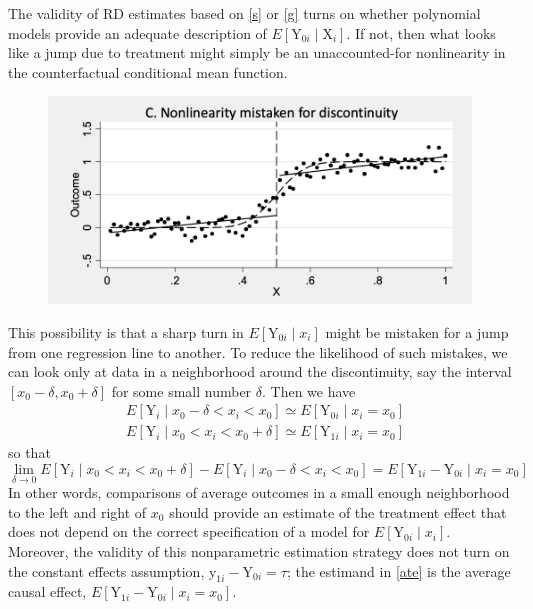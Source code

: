 \documentclass[11pt]{book}%
\begin{document}
The validity of RD estimates based on \ref{s} or \ref{g} turns on whether polynomial models provide an
adequate description of $E\left[\mathrm{Y}_{0 i} \mid \mathrm{X}_{i}\right] .$ If not, then what looks like a jump due to treatment might simply be an
unaccounted-for nonlinearity in the counterfactual conditional mean function.
\begin{figure}[H]
	\centering
	\includegraphics[scale=0.6]{mis.png}
\end{figure}
 This possibility is that a sharp turn in $E\left[\mathrm{Y}_{0 i} \mid x_{i}\right]$ might be mistaken for a jump from
one regression line to another. To reduce the likelihood of such mistakes, we can look only at data in a
neighborhood around the discontinuity, say the interval $\left[x_{0}-\delta, x_{0}+\delta\right]$ for some small number $\delta$. Then we
have
$$
\begin{aligned}
&E\left[\mathrm{Y}_{i} \mid x_{0}-\delta<x_{i}<x_{0}\right] \simeq E\left[\mathrm{Y}_{0 i} \mid x_{i}=x_{0}\right] \\
&E\left[\mathrm{Y}_{i} \mid x_{0}<x_{i}<x_{0}+\delta\right] \simeq E\left[\mathrm{Y}_{1 i} \mid x_{i}=x_{0}\right]
\end{aligned}
$$
so that
\begin{equation}\label{ate}
\lim _{\delta \rightarrow 0} E\left[\mathrm{Y}_{i} \mid x_{0}<x_{i}<x_{0}+\delta\right]-E\left[\mathrm{Y}_{i} \mid x_{0}-\delta<x_{i}<x_{0}\right]=E\left[\mathrm{Y}_{1 i}-\mathrm{Y}_{0 i} \mid x_{i}=x_{0}\right]
\end{equation}
In other words, comparisons of average outcomes in a small enough neighborhood to the left and right of $x_{0}$
should provide an estimate of the treatment effect that does not depend on the correct specification of a model
for $E\left[\mathrm{Y}_{0 i} \mid x_{i}\right]$. Moreover, the validity of this nonparametric estimation strategy does not turn on the constant
effects assumption, $\mathrm{y}_{1 i}-\mathrm{Y}_{0 i}=\tau$; the estimand in \ref{ate} is the average causal effect, $E\left[\mathrm{Y}_{1 i}-\mathrm{Y}_{0 i} \mid x_{i}=x_{0}\right]$.
\end{document}

